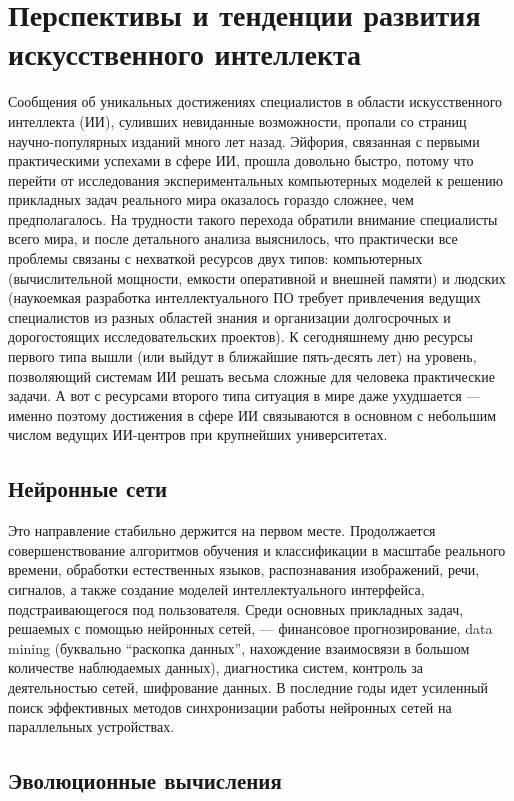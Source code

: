 \section{Перспективы и тенденции развития искусственного интеллекта}

Сообщения об уникальных достижениях специалистов в области искусственного интеллекта (ИИ), суливших невиданные возможности, пропали со страниц научно-популярных изданий много лет назад. Эйфория, связанная с первыми практическими успехами в сфере ИИ, прошла довольно быстро, потому что перейти от исследования экспериментальных компьютерных моделей к решению прикладных задач реального мира оказалось гораздо сложнее, чем предполагалось. На трудности такого перехода обратили внимание специалисты всего мира, и после детального анализа выяснилось, что практически все проблемы связаны с нехваткой ресурсов двух типов: компьютерных (вычислительной мощности, емкости оперативной и внешней памяти) и людских (наукоемкая разработка интеллектуального ПО требует привлечения ведущих специалистов из разных областей знания и организации долгосрочных и дорогостоящих исследовательских проектов). К сегодняшнему дню ресурсы первого типа вышли (или выйдут в ближайшие пять-десять лет) на уровень, позволяющий системам ИИ решать весьма сложные для человека практические задачи. А вот с ресурсами второго типа ситуация в мире даже ухудшается --- именно поэтому достижения в сфере ИИ связываются в основном с небольшим числом ведущих ИИ-центров при крупнейших университетах.

\subsection{Нейронные сети}

Это направление стабильно держится на первом месте. Продолжается совершенствование алгоритмов обучения и классификации в масштабе реального времени, обработки естественных языков, распознавания изображений, речи, сигналов, а также создание моделей интеллектуального интерфейса, подстраивающегося под пользователя. Среди основных прикладных задач, решаемых с помощью нейронных сетей, --- финансовое прогнозирование, data mining (буквально ``раскопка данных'', нахождение взаимосвязи в большом количестве наблюдаемых данных), диагностика систем, контроль за деятельностью сетей, шифрование данных. В последние годы идет усиленный поиск эффективных методов синхронизации работы нейронных сетей на параллельных устройствах.

\subsection{Эволюционные вычисления}

